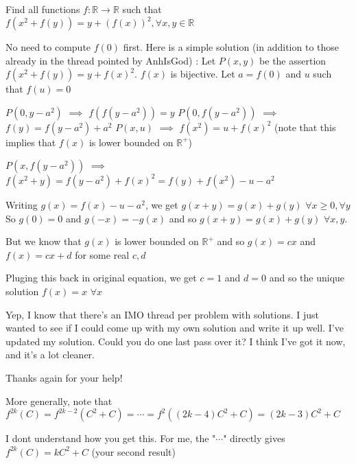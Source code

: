 \begin{solution}
	\begin{tcolorbox}Find all functions $f:\mathbb{R}\rightarrow\mathbb{R}$ such that $f(x^2+f(y))=y+\left(f(x)\right)^2, \forall x,y\in\mathbb{R}$\end{tcolorbox}
No need to compute $f(0)$ first. Here is a simple solution (in addition to those already in the thread pointed by AnhIsGod) :
Let $P(x,y)$ be the assertion $f(x^2+f(y))=y+f(x)^2$. $f(x)$ is bijective.
Let $a=f(0)$ and $u$ such that $f(u)=0$

$P(0,y-a^2)$  $\implies$ $f(f(y-a^2))=y$
$P(0,f(y-a^2))$ $\implies$ $f(y)=f(y-a^2)+a^2$
$P(x,u)$ $\implies$ $f(x^2)=u+f(x)^2$ (note that this implies that $f(x)$ is lower bounded on $\mathbb R^+$)

$P(x,f(y-a^2))$ $\implies$ $f(x^2+y)=f(y-a^2)+f(x)^2=f(y)+f(x^2)-u-a^2$

Writing $g(x)=f(x)-u-a^2$, we get $g(x+y)=g(x)+g(y)$ $\forall x\ge 0,\forall y$
So $g(0)=0$ and $g(-x)=-g(x)$ and so $g(x+y)=g(x)+g(y)$ $\forall x,y$.

But we know that $g(x)$ is lower bounded on $\mathbb R^+$ and so $g(x)=cx$ and $f(x)=cx+d$ for some real $c,d$

Pluging this back in original equation, we get $c=1$ and $d=0$ and so the unique solution $\boxed{f(x)=x}$ $\forall x$
\end{solution}



\begin{solution}
	Yep, I know that there's an IMO thread per problem with solutions. I just wanted to see if I could come up with my own solution and write it up well. I've updated my solution. Could you do one last pass over it? I think I've got it now, and it's a lot cleaner.

Thanks again for your help!
\end{solution}



\begin{solution}
	\begin{tcolorbox} More generally, note that $f^{2k}(C)= f^{2k-2}(C^2 + C) = \cdots = f^2((2k-4)C^2 + C) = (2k-3)C^2 + C$\end{tcolorbox}
I dont understand how you get this.
For me, the "$\cdots$" directly gives $f^{2k}(C)=kC^2+C$ (your second result)
\end{solution}



